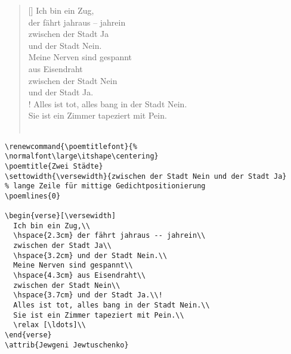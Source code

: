 \begin{verse}[\versewidth]
Ich bin ein Zug,\\
\hspace{2.3cm} der fährt jahraus -- jahrein\\
 zwischen der Stadt Ja\\
\hspace{3.2cm}                          und der Stadt Nein.\\
 Meine Nerven sind gespannt\\
\hspace{4.3cm}                            aus Eisendraht\\
 zwischen der Stadt Nein\\
 \hspace{3.7cm}  und der Stadt Ja.\\!
 Alles ist tot, alles bang in der Stadt Nein.\\
 Sie ist ein Zimmer tapeziert mit Pein.\\
 \relax [\ldots]\\
\end{verse}

\begin{lstlisting}
\renewcommand{\poemtitlefont}{%
\normalfont\large\itshape\centering}
\poemtitle{Zwei Städte}
\settowidth{\versewidth}{zwischen der Stadt Nein und der Stadt Ja}
% lange Zeile für mittige Gedichtpositionierung
\poemlines{0}   

\begin{verse}[\versewidth]
  Ich bin ein Zug,\\
  \hspace{2.3cm} der fährt jahraus -- jahrein\\
  zwischen der Stadt Ja\\
  \hspace{3.2cm} und der Stadt Nein.\\
  Meine Nerven sind gespannt\\
  \hspace{4.3cm} aus Eisendraht\\
  zwischen der Stadt Nein\\
  \hspace{3.7cm} und der Stadt Ja.\\!
  Alles ist tot, alles bang in der Stadt Nein.\\
  Sie ist ein Zimmer tapeziert mit Pein.\\
  \relax [\ldots]\\
\end{verse}
\attrib{Jewgeni Jewtuschenko}
\end{lstlisting}


